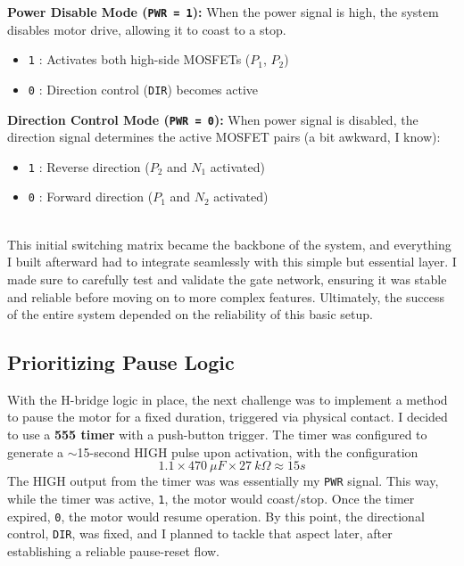 \documentclass{article}
\newcommand{\code}[1]{\colorbox{light-gray}{\texttt{#1}}}
\begin{document}
\hspace*{-1em}
\begin{minipage}{0.53\textwidth}
	\textbf{Power Disable Mode (\texttt{PWR = 1}):} 
	When the power signal is high, the system disables motor drive, allowing it to coast to a stop.
	\begin{itemize}[itemsep=-1mm]
		\item \code{1} : Activates both high-side MOSFETs ($P_1$, $P_2$)
		\item \code{0} : Direction control (\texttt{DIR}) becomes active
	\end{itemize}	
\end{minipage}\hspace{1em}
\begin{minipage}{0.5\textwidth}
	\textbf{Direction Control Mode (\texttt{PWR = 0}):} 
	When power signal is disabled, the direction signal determines the active MOSFET pairs (a bit awkward, I know):
	\begin{itemize}[itemsep=-1mm]
		\item \code{1} : Reverse direction ($P_2$ and $N_1$ activated)
		\item \code{0} : Forward direction ($P_1$ and $N_2$ activated)
	\end{itemize}
\end{minipage}\\[5pt]
This initial switching matrix became the backbone of the system, and everything I built afterward had to integrate seamlessly with this simple but essential layer. I made sure to carefully test and validate the gate network, ensuring it was stable and reliable before moving on to more complex features. Ultimately, the success of the entire system depended on the reliability of this basic setup.
\vspace{-0.4em}
\subsection{Prioritizing Pause Logic}
With the H-bridge logic in place, the next challenge was to implement a method to {pause the motor} for a fixed duration, triggered via physical contact. I decided to use a \textbf{555 timer} with a push-button trigger. The timer was configured to generate a $\sim$15-second HIGH pulse upon activation, with the configuration $$1.1 \times 470\ \mu{F} \times 27\ {k}\Omega\approx 15s$$
The HIGH output from the timer was was essentially my \texttt{PWR} signal. This way, while the timer was active, \code{1}, the motor would {coast/stop}. Once the timer expired, \code{0}, the motor would resume operation. By this point, the directional control, \texttt{DIR}, was fixed, and I planned to tackle that aspect later, after establishing a reliable pause-reset flow.
\end{document}
